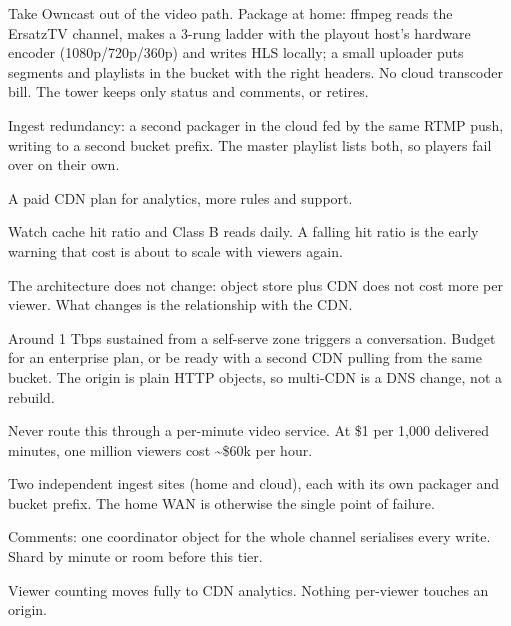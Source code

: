 \documentclass[fontpath=fonts/,logopath=logo/]{riposte-doc}
\begin{document}
\begin{ripbullets}
\item Take Owncast out of the video path. Package at home: ffmpeg reads the ErsatzTV channel, makes a 3-rung ladder with the playout host's hardware encoder (1080p/720p/360p) and writes HLS locally; a small uploader puts segments and playlists in the bucket with the right headers. No cloud transcoder bill. The tower keeps only status and comments, or retires.
\item Ingest redundancy: a second packager in the cloud fed by the same RTMP push, writing to a second bucket prefix. The master playlist lists both, so players fail over on their own.
\item A paid CDN plan for analytics, more rules and support.
\item Watch cache hit ratio and Class B reads daily. A falling hit ratio is the early warning that cost is about to scale with viewers again.
\end{ripbullets}


The architecture does not change: object store plus CDN does not cost more per viewer. What changes is the relationship with the CDN.

\begin{ripbullets}
\item Around 1 Tbps sustained from a self-serve zone triggers a conversation. Budget for an enterprise plan, or be ready with a second CDN pulling from the same bucket. The origin is plain HTTP objects, so multi-CDN is a DNS change, not a rebuild.
\item Never route this through a per-minute video service. At \$1 per 1,000 delivered minutes, one million viewers cost \textasciitilde{}\$60k per hour.
\item Two independent ingest sites (home and cloud), each with its own packager and bucket prefix. The home WAN is otherwise the single point of failure.
\item Comments: one coordinator object for the whole channel serialises every write. Shard by minute or room before this tier.
\item Viewer counting moves fully to CDN analytics. Nothing per-viewer touches an origin.
\end{ripbullets}
\end{document}

